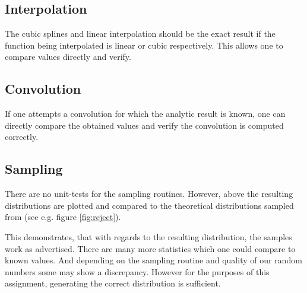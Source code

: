\documentclass[10pt, a4paper]{article}
\begin{document}
  \subsection{Interpolation}
  The cubic splines and linear interpolation should be the exact result if the function being interpolated
  is linear or cubic respectively. This allows one to compare values directly and verify.

  \subsection{Convolution}
  If one attempts a convolution for which the analytic result is known, one can directly compare the
  obtained values and verify the convolution is computed correctly.

  \subsection{Sampling}
  There are no unit-tests for the sampling routines. However, above the resulting distributions
  are plotted and compared to the theoretical distributions sampled from (see e.g. figure \ref{fig:reject}).

  This demonstrates, that with regards to the resulting distribution, the samples work as advertised.
  There are many more statistics which one could compare to known values. And depending on the sampling
  routine and quality of our random numbers some may show a discrepancy. However for the purposes of
  this assignment, generating the correct distribution is sufficient.
\end{document}

